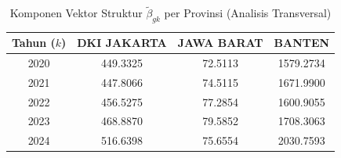 \begin{table}[H]
\centering
\small
\caption{Komponen Vektor Struktur $\tilde{\beta}_{gk}$ per Provinsi (Analisis Transversal)} \label{tab:app1beta_provinsi}
\begin{tabular}{|c|c|c|c|}
\hline
\textbf{Tahun ($k$)} & \textbf{DKI JAKARTA} & \textbf{JAWA BARAT} & \textbf{BANTEN} \\
\hline
2020 & 449.3325 & 72.5113 & 1579.2734 \\
2021 & 447.8066 & 74.5115 & 1671.9900 \\
2022 & 456.5275 & 77.2854 & 1600.9055 \\
2023 & 468.8870 & 79.5852 & 1708.3063 \\
2024 & 516.6398 & 75.6554 & 2030.7593 \\
\hline
\end{tabular}
\end{table}